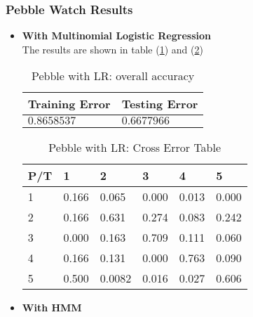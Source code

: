 \subsubsection{Pebble Watch Results}
\label{subsec:pebbleresult}
\begin{itemize}
\item \textbf{With Multinomial Logistic Regression} \\
The results are shown in table (\ref{tab:pebbleLR1}) and (\ref{tab:pebbleLR2})
\begin{table}
\begin{center}
\begin{tabular}{|l|l|}
      \hline
      Training Error & Testing Error\\
      \hline
      $0.8658537$ & $0.6677966$ \\
      \hline
\end{tabular}
\caption{Pebble with LR: overall accuracy}
\label{tab:pebbleLR1}
\end{center}
\end{table}

\begin{table}
\begin{center}
\begin{tabular}{|l|l|l|l|l|l|}
      \hline
      P/T& 1 & 2 &3 & 4 & 5 \\
      \hline
      1 &0.166&0.065&0.000&0.013&0.000\\
      2 &0.166&0.631&0.274&0.083&0.242\\
      3 &0.000&0.163&0.709&0.111&0.060\\
      4 &0.166&0.131&0.000&0.763&0.090\\
      5 &0.500&0.0082&0.016&0.027&0.606\\
      \hline
\end{tabular}
\caption{Pebble with LR: Cross Error Table}
\label{tab:pebbleLR2}
\end{center}
\end{table}

\item \textbf{With HMM}


\end{itemize}
